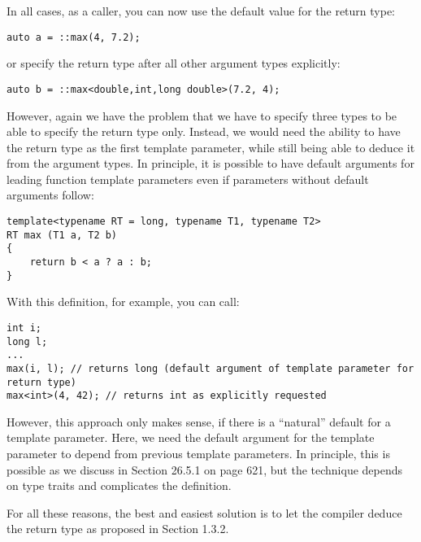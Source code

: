 In all cases, as a caller, you can now use the default value for the return type:

\begin{lstlisting}[style=styleCXX]
auto a = ::max(4, 7.2);
\end{lstlisting}

or specify the return type after all other argument types explicitly:

\begin{lstlisting}[style=styleCXX]
auto b = ::max<double,int,long double>(7.2, 4);
\end{lstlisting}

However, again we have the problem that we have to specify three types to be able to specify the return type only. Instead, we would need the ability to have the return type as the first template parameter, while still being able to deduce it from the argument types. In principle, it is possible to have default arguments for leading function template parameters even if parameters without default arguments follow:

\begin{lstlisting}[style=styleCXX]
template<typename RT = long, typename T1, typename T2>
RT max (T1 a, T2 b)
{
	return b < a ? a : b;
}
\end{lstlisting}

With this definition, for example, you can call:

\begin{lstlisting}[style=styleCXX]
int i;
long l;
...
max(i, l); // returns long (default argument of template parameter for return type)
max<int>(4, 42); // returns int as explicitly requested
\end{lstlisting}

However, this approach only makes sense, if there is a “natural” default for a template parameter. Here, we need the default argument for the template parameter to depend from previous template parameters. In principle, this is possible as we discuss in Section 26.5.1 on page 621, but the technique depends on type traits and complicates the definition.

For all these reasons, the best and easiest solution is to let the compiler deduce the return type as proposed in Section 1.3.2.
